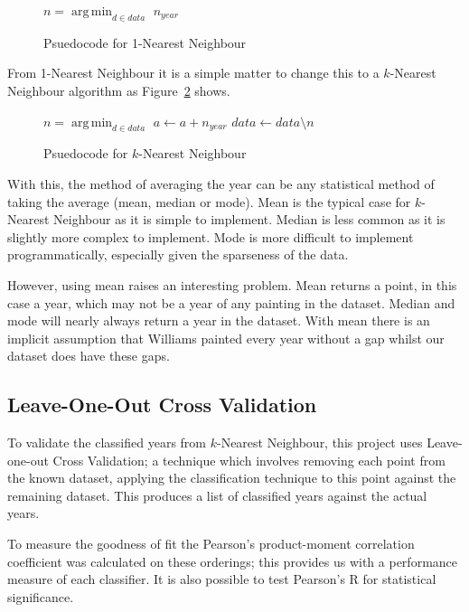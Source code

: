 \begin{figure}[h]
\begin{algorithmic}
\State $n = \operatorname*{arg\,min}_{d \in data}$ 
\State\Return $n_{year}$
\EndFunction
\end{algorithmic}
\caption{Psuedocode for 1-Nearest Neighbour}\label{fig:1nn}
\end{figure}

From 1-Nearest Neighbour it is a simple matter to change this to a $k$-Nearest Neighbour algorithm
as Figure~\ref{fig:knn} shows.

\begin{figure}[h]
\begin{algorithmic}
\State $n = \operatorname*{arg\,min}_{d \in data}$ 
\State $a \gets a + n_{year}$
\State $data \gets data \setminus n$
\EndFor
\State \Return {}
\EndFunction
\end{algorithmic}
\caption{Psuedocode for $k$-Nearest Neighbour}\label{fig:knn}
\end{figure}

With this, the method of averaging the year can be any statistical method of taking the average
(mean, median or mode). Mean is the typical case for $k$-Nearest Neighbour as it is simple to
implement. Median is less common as it is slightly more complex to implement. Mode is more 
difficult to implement programmatically, especially given the sparseness of the data. 

However, using mean raises an interesting problem. Mean returns a point, in this case a year, 
which may not be a year of any painting in the dataset. Median and mode will nearly always return
a year in the dataset. With mean there is an implicit assumption that Williams painted every year
without a gap whilst our dataset does have these gaps. 


\subsection{Leave-One-Out Cross Validation}
To validate the classified years from $k$-Nearest Neighbour, this project uses Leave-one-out Cross
Validation; a technique which involves removing each point from the known dataset, applying the
classification technique to this point against the remaining dataset. This produces a list of
classified years against the actual years.

To measure the goodness of fit the Pearson's product-moment correlation coefficient was 
calculated on these orderings; this provides us with a performance measure of each classifier. 
It is also possible to test Pearson's R for statistical significance.

